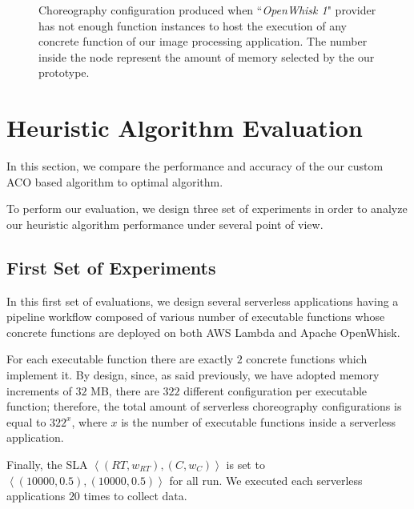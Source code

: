 \documentclass[12pt,a4paper]{report}
\newcommand{\ItalicQuotMark}[1]{``\textit{#1}"}
\begin{document}
\begin{figure}[!ht]
\begin{tikzpicture}
	\end{tikzpicture}
	\caption{Choreography configuration produced when \ItalicQuotMark{OpenWhisk 1} provider has not enough function instances to host the execution of any concrete function of our image processing application. The number inside the node represent the amount of memory selected by the our prototype.}
	\label{imageProcessingAppStep2}
\end{figure}



\newpage
\section{Heuristic Algorithm Evaluation}

In this section, we compare the performance and accuracy of the our custom ACO based algorithm to optimal algorithm. 

To perform our evaluation, we design three set of experiments in order to analyze our heuristic algorithm performance under several point of view.

\subsection{First Set of Experiments}

In this first set of evaluations, we design several serverless applications having a pipeline workflow composed of various number of executable functions whose concrete functions are deployed on both AWS Lambda and Apache OpenWhisk. 

For each executable function there are exactly $2$ concrete functions which implement it.  By design, since, as said previously, we have adopted memory increments of $32$ MB, there are $322$ different configuration per executable function; therefore, the total amount of serverless choreography configurations is equal to $322^{x}$, where $x$ is the number of executable functions inside a serverless application.

Finally, the SLA $\left\langle (RT,w_{RT}),(C,w_{C}) \right\rangle$ is set to $\left\langle (10000,0.5),(10000,0.5) \right\rangle$ for all run. We executed each serverless applications $20$ times to collect data.
\end{document}
